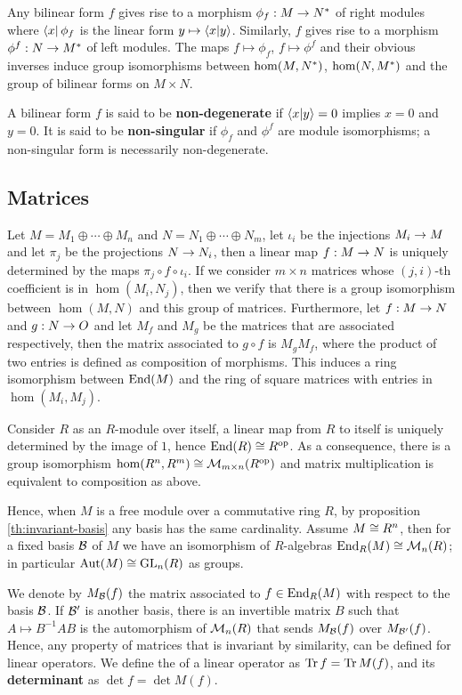 Any bilinear form $f$ gives rise to a morphism $ \phi_f : M \rightarrow
N^\ast$ of right modules where $\left\langle x \right\rvert\phi_f$ is the linear form $y
\mapsto \left\langle x \middle| y \right\rangle$. Similarly, $f$ gives rise to a morphism
$\phi^f:N\rightarrow M^\ast$ of left modules. The maps $f\mapsto\phi_f$,
$f\mapsto\phi^f$ and their obvious inverses induce group isomorphisms
between $\hom(M,N^\ast)$, $\hom(N,M^\ast)$ and the group of
bilinear forms on $M\times N$.

A bilinear form $f$ is said to be
\textbf{non-degenerate} if
$\left\langle x \middle| y \right\rangle=0$ implies $x=0$ and $y=0$. It is said to
be \textbf{non-singular} if $\phi_f$ and
$\phi^f$ are module isomorphisms; a non-singular form is necessarily
non-degenerate.


\subsection{Matrices}
\label{sec:linear-algebra:matrices}
Let $M=M_1\oplus\cdots\oplus M_n$ and $N=N_1\oplus\cdots\oplus N_m$,
let $\iota_i$ be the injections $M_i\rightarrow M$ and let $\pi_j$ be the
projections $N\rightarrow N_i$, then a linear map $f:M\rightarrow N$ is uniquely
determined by the maps $\pi_j\circ f\circ\iota_i$. If we consider
$m\times n$ matrices whose $(j,i)$-th coefficient is in
$\hom(M_i,N_j)$, then we verify that there is a group isomorphism
between $\hom(M,N)$ and this group of matrices. Furthermore, let
$f:M\rightarrow N$ and $g:N\rightarrow O$ and let $M_f$ and $M_g$ be the matrices that
are associated respectively, then the matrix associated to $g\circ f$
is $M_gM_f$, where the product of two entries is defined as
composition of morphisms. This induces a ring isomorphism between
$\operatorname{End}(M)$ and the ring of square matrices with entries in
$\hom(M_i,M_j)$.

Consider $R$ as an $R$-module over itself, a linear map from $R$ to
itself is uniquely determined by the image of $1$, hence $\operatorname{End}(R)\cong
R^{\mathrm{op}}$. As a consequence, there is a group isomorphism
$\hom(R^n,R^m)\cong\operatorname{\mathcal{M}}_{m\times n}(R^{\mathrm{op}})$ and matrix multiplication
is equivalent to composition as above.

Hence, when $M$ is a free module over a commutative ring $R$, by
proposition \ref{th:invariant-basis} any basis has the same
cardinality. Assume $M\cong R^n$, then for a fixed basis $\mathcal{B}$
of $M$ we have an isomorphism of $R$-algebras
$\operatorname{End}_R(M)\cong\operatorname{\mathcal{M}}_n(R)$; in particular $\operatorname{Aut}(M)\cong\operatorname{GL}_n(R)$ as
groups.

We denote by $M_{\mathcal{B}}(f)$ the matrix associated to
$f\in\operatorname{End}_R(M)$ with respect to the basis $\mathcal{B}$.  If
$\mathcal{B'}$ is another basis, there is an invertible matrix $B$ such
that $A\mapsto B^{-1}AB$ is the automorphism of $\operatorname{\mathcal{M}}_n(R)$ that sends
$M_{\mathcal{B}}(f)$ over $M_{\mathcal{B'}}(f)$. Hence, any property of
matrices that is invariant by similarity, can be defined for linear
operators. We define the 
 of a linear operator as $\operatorname{Tr} f = \operatorname{Tr} M(f)$, and
its \textbf{determinant} as $\det f = \det M(f)$.


